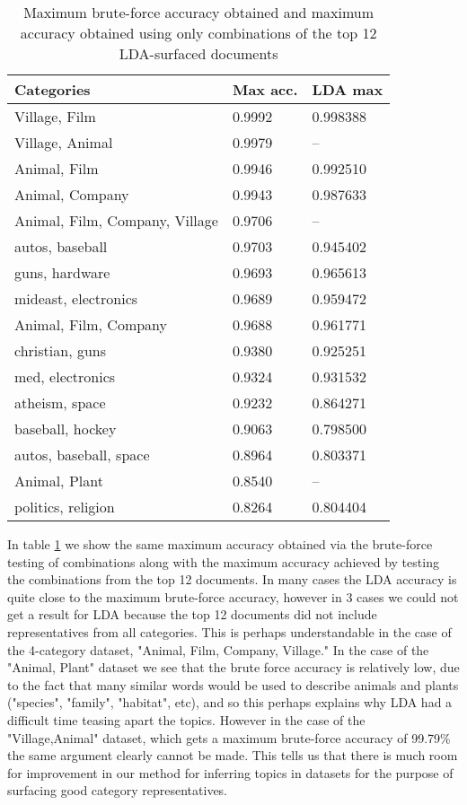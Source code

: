 \begin{table}[]
\centering
\captionsetup{position=bottom}
\begin{tabular}{lll}
\toprule
Categories                  & Max acc. & LDA max \\
\midrule
Village, Film                & 0.9992       & 0.998388    \\
Village, Animal              & 0.9979       & --         \\
Animal, Film                 & 0.9946       & 0.992510    \\
Animal, Company              & 0.9943       & 0.987633    \\
Animal, Film, Company, Village & 0.9706       & --         \\
autos, baseball              & 0.9703       & 0.945402    \\
guns, hardware               & 0.9693       & 0.965613    \\
mideast, electronics         & 0.9689       & 0.959472    \\
Animal, Film, Company         & 0.9688       & 0.961771    \\
christian, guns              & 0.9380       & 0.925251    \\
med, electronics             & 0.9324       & 0.931532    \\
atheism, space               & 0.9232       & 0.864271    \\
baseball, hockey             & 0.9063       & 0.798500    \\
autos, baseball, space        & 0.8964       & 0.803371    \\
Animal, Plant                & 0.8540       & --         \\
politics, religion           & 0.8264       & 0.804404   \\
\bottomrule
\end{tabular}
\caption{Maximum brute-force accuracy obtained and maximum accuracy obtained using only combinations of the top 12 LDA-surfaced documents}\label{ldaacc}
\end{table}

In table \ref{ldaacc} we show the same maximum accuracy obtained via the brute-force testing of combinations along with the maximum accuracy achieved by testing the combinations from the top 12 documents. In many cases the LDA accuracy is quite close to the maximum brute-force accuracy, however in 3 cases we could not get a result for LDA because the top 12 documents did not include representatives from all categories. This is perhaps understandable in the case of the 4-category dataset, "Animal, Film, Company, Village." In the case of the "Animal, Plant" dataset we see that the brute force accuracy is relatively low, due to the fact that many similar words would be used to describe animals and plants ("species", "family", "habitat", etc), and so this perhaps explains why LDA had a difficult time teasing apart the topics. However in the case of the "Village,Animal" dataset, which gets a maximum brute-force accuracy of 99.79\% the same argument clearly cannot be made. This tells us that there is much room for improvement in our method for inferring topics in datasets for the purpose of surfacing good category representatives.

